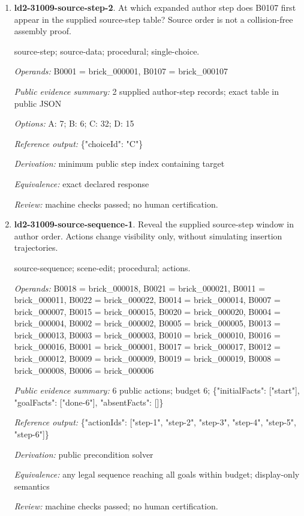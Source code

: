 \begin{enumerate}
\item \textbf{ld2-31009-source-step-2}. At which expanded author step does B0107 first appear in the supplied source-step table? Source order is not a collision-free assembly proof.
\par{\small source-step; source-data; procedural; single-choice.\par\textit{Operands:} B0001 = brick\_000001, B0107 = brick\_000107\par\textit{Public evidence summary:} 2 supplied author-step records; exact table in public JSON\par\textit{Options:} A: 7; B: 6; C: 32; D: 15\par\textit{Reference output:} \{"choiceId": "C"\}\par\textit{Derivation:} minimum public step index containing target\par\textit{Equivalence:} exact declared response\par\textit{Review:} machine checks passed; no human certification.}
\item \textbf{ld2-31009-source-sequence-1}. Reveal the supplied source-step window in author order. Actions change visibility only, without simulating insertion trajectories.
\par{\small source-sequence; scene-edit; procedural; actions.\par\textit{Operands:} B0018 = brick\_000018, B0021 = brick\_000021, B0011 = brick\_000011, B0022 = brick\_000022, B0014 = brick\_000014, B0007 = brick\_000007, B0015 = brick\_000015, B0020 = brick\_000020, B0004 = brick\_000004, B0002 = brick\_000002, B0005 = brick\_000005, B0013 = brick\_000013, B0003 = brick\_000003, B0010 = brick\_000010, B0016 = brick\_000016, B0001 = brick\_000001, B0017 = brick\_000017, B0012 = brick\_000012, B0009 = brick\_000009, B0019 = brick\_000019, B0008 = brick\_000008, B0006 = brick\_000006\par\textit{Public evidence summary:} 6 public actions; budget 6; \{"initialFacts": ["start"], "goalFacts": ["done-6"], "absentFacts": []\}\par\textit{Reference output:} \{"actionIds": ["step-1", "step-2", "step-3", "step-4", "step-5", "step-6"]\}\par\textit{Derivation:} public precondition solver\par\textit{Equivalence:} any legal sequence reaching all goals within budget; display-only semantics\par\textit{Review:} machine checks passed; no human certification.}

\end{enumerate}
